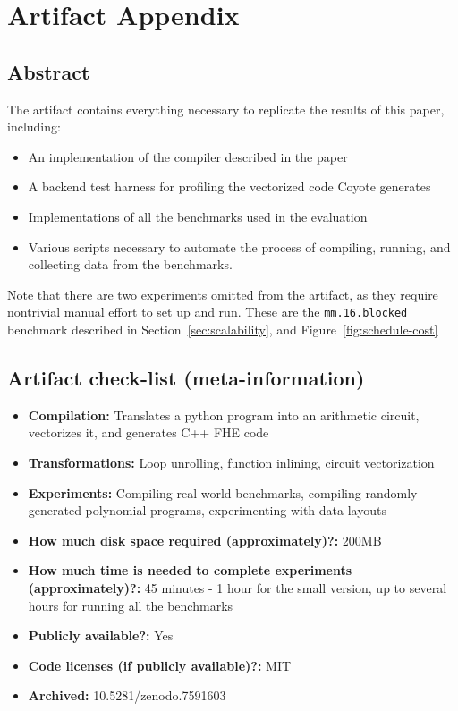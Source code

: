 \section{Artifact Appendix}

\subsection{Abstract}

The artifact contains everything necessary to replicate the results of this paper, including:
\begin{itemize}
    \item An implementation of the compiler described in the paper
    \item A backend test harness for profiling the vectorized code Coyote generates
    \item Implementations of all the benchmarks used in the evaluation
    \item Various scripts necessary to automate the process of compiling, running, and collecting data from the benchmarks.
\end{itemize}

Note that there are two experiments omitted from the artifact, as they require nontrivial manual effort to set up and run. These are the {\tt mm.16.blocked} benchmark described in Section~\ref{sec:scalability}, and Figure~\ref{fig:schedule-cost}

\subsection{Artifact check-list (meta-information)}

{\small
\begin{itemize}
  \item {\bf Compilation: } Translates a python program into an arithmetic circuit, vectorizes it, and generates C++ FHE code
  \item {\bf Transformations: } Loop unrolling, function inlining, circuit vectorization
  \item {\bf Experiments: } Compiling real-world benchmarks, compiling randomly generated polynomial programs, experimenting with data layouts
  \item {\bf How much disk space required (approximately)?: } 200MB
  \item {\bf How much time is needed to complete experiments (approximately)?: } 45 minutes - 1 hour for the small version, up to several hours for running all the benchmarks
  \item {\bf Publicly available?: } Yes
  \item {\bf Code licenses (if publicly available)?: } MIT
  \item {\bf Archived: } 10.5281/zenodo.7591603
  
\end{itemize}
}

